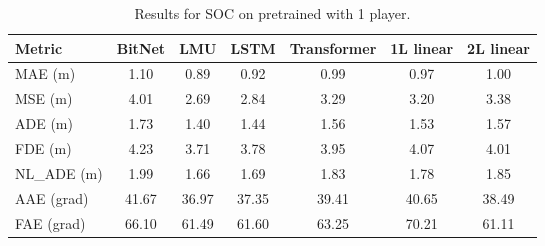 \begin{table}[H]
\centering
\caption{Results for SOC on pretrained with 1 player.}
\label{pre:SOC}
\begin{tabular}{l||c|c|c|c|c|c}

Metric & BitNet & LMU & LSTM & Transformer & 1L linear & 2L linear \\
\hline\hline
MAE (m) & 1.10 & 0.89 & 0.92 & 0.99 & 0.97 & 1.00 \\
MSE (m) & 4.01 & 2.69 & 2.84 & 3.29 & 3.20 & 3.38 \\
ADE (m) & 1.73 & 1.40 & 1.44 & 1.56 & 1.53 & 1.57 \\
FDE (m) & 4.23 & 3.71 & 3.78 & 3.95 & 4.07 & 4.01 \\
NL\_ADE (m) & 1.99 & 1.66 & 1.69 & 1.83 & 1.78 & 1.85 \\
AAE (grad) & 41.67 & 36.97 & 37.35 & 39.41 & 40.65 & 38.49 \\
FAE (grad) & 66.10 & 61.49 & 61.60 & 63.25 & 70.21 & 61.11 \\
\end{tabular}
\end{table}
